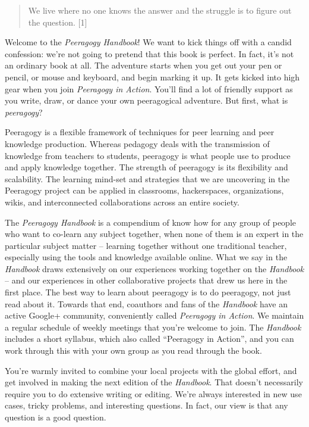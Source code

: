 \begin{quote}
We live where no one knows the answer and the struggle is to figure out
the question. {[}1{]}
\end{quote}

Welcome to the \emph{Peeragogy Handbook}! We want to kick things off
with a candid confession: we're not going to pretend that this book is
perfect. In fact, it's not an ordinary book at all. The adventure starts
when you get out your pen or pencil, or mouse and keyboard, and begin
marking it up. It gets kicked into high gear when you join
\emph{Peeragogy in Action}. You'll find a lot of friendly support as you
write, draw, or dance your own peeragogical adventure. But first, what
is \emph{peeragogy}?

Peeragogy is a flexible framework of techniques for peer learning and
peer knowledge production. Whereas pedagogy deals with the transmission
of knowledge from teachers to students, peeragogy is what people use to
produce and apply knowledge together. The strength of peeragogy is its
flexibility and scalability. The learning mind-set and strategies that
we are uncovering in the Peeragogy project can be applied in classrooms,
hackerspaces, organizations, wikis, and interconnected collaborations
across an entire society.

The \emph{Peeragogy Handbook} is a compendium of know how for any group
of people who want to co-learn any subject together, when none of them
is an expert in the particular subject matter -- learning together
without one traditional teacher, especially using the tools and
knowledge available online. What we say in the \emph{Handbook} draws
extensively on our experiences working together on the \emph{Handbook}
-- and our experiences in other collaborative projects that drew us here
in the first place. The best way to learn about peeragogy is to do
peeragogy, not just read about it. Towards that end, coauthors and fans
of the \emph{Handbook} have an active Google+ community, conveniently
called \emph{Peeragogy in Action}. We maintain a regular schedule of
weekly meetings that you're welcome to join. The \emph{Handbook}
includes a short syllabus, which also called ``Peeragogy in Action'',
and you can work through this with your own group as you read through
the book.

You're warmly invited to combine your local projects with the global
effort, and get involved in making the next edition of the
\emph{Handbook}. That doesn't necessarily require you to do extensive
writing or editing. We're always interested in new use cases, tricky
problems, and interesting questions. In fact, our view is that any
question is a good question.

